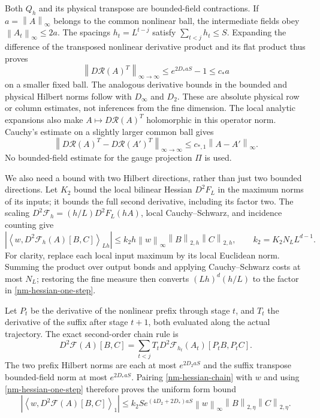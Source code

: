 \documentclass[11pt]{article}
\theoremstyle{remark}\newtheorem{remark}[theorem]{Remark}
\newcommand{\norm}[1]{\left\lVert#1\right\rVert}
\begin{document}
Both $Q_h$ and its physical transpose are bounded-field
contractions. If $a=\norm{A}_\infty$ belongs to the common nonlinear
ball, the intermediate fields obey $\norm{A_t}_\infty\le2a$.
The spacings $h_t=L^{t-j}$ satisfy $\sum_{t<j}h_t\le S$.
Expanding the difference of the transposed nonlinear derivative
product and its flat product thus proves
\begin{equation}\label{nm-adjoint-composite}
 \norm{D\mathcal R(A)^T}_{\infty\to\infty}
 \le e^{2D_*aS}-1\le c_*a
\end{equation}
on a smaller fixed ball. The analogous derivative bounds in the
bounded and physical Hilbert norms follow with $D_\infty$ and
$D_2$. These are absolute physical row or column estimates, not
inferences from the fine dimension. The local analytic expansions
also make $A\mapsto D\mathcal R(A)^T$ holomorphic in this operator
norm. Cauchy's estimate on a slightly larger common ball gives
\begin{equation}\label{nm-adjoint-lipschitz}
 \norm{D\mathcal R(A)^T-D\mathcal R(A')^T}_{\infty\to\infty}
 \le c_{*,1}\norm{A-A'}_\infty.
\end{equation}
No bounded-field estimate for the gauge projection $\Pi$ is used.

We also need a bound with two Hilbert directions, rather than just
two bounded directions. Let $K_2$ bound the local bilinear Hessian
$D^2F_L$ in the maximum norms of its inputs; it bounds the full
second derivative, including its factor two. The scaling
$D^2\mathcal F_h=(h/L)D^2F_L(hA)$, local Cauchy--Schwarz, and
incidence counting give
\begin{equation}\label{nm-hessian-one-step}
 \left|\left\langle w,D^2\mathcal F_h(A)[B,C]\right\rangle_{Lh}\right|
 \le k_2h\norm{w}_\infty\norm{B}_{2,h}\norm{C}_{2,h},
 \qquad k_2=K_2N_LL^{d-1}.
\end{equation}
For clarity, replace each local input maximum by its local
Euclidean norm. Summing the product over output bonds and applying
Cauchy--Schwarz costs at most $N_L$; restoring the fine measure
then converts $(Lh)^d(h/L)$ to the factor in
\eqref{nm-hessian-one-step}.

Let $P_t$ be the derivative of the nonlinear prefix through stage
$t$, and $T_t$ the derivative of the suffix after stage $t+1$,
both evaluated along the actual trajectory. The exact second-order
chain rule is
\begin{equation}\label{nm-hessian-chain}
 D^2\mathcal F(A)[B,C]
 =\sum_{t<j}T_tD^2\mathcal F_{h_t}(A_t)[P_tB,P_tC].
\end{equation}
The two prefix Hilbert norms are each at most $e^{2D_2aS}$ and the
suffix transpose bounded-field norm at most $e^{2D_*aS}$.
Pairing \eqref{nm-hessian-chain} with $w$ and using
\eqref{nm-hessian-one-step} therefore proves the uniform form bound
\begin{equation}\label{nm-hessian-composite}
 \boxed{\quad
 \left|\left\langle w,D^2\mathcal F(A)[B,C]\right\rangle_1\right|
 \le k_2S e^{(4D_2+2D_*)aS}
       \norm{w}_\infty\norm{B}_{2,\eta}\norm{C}_{2,\eta}.
 \quad}
\end{equation}
\end{document}
